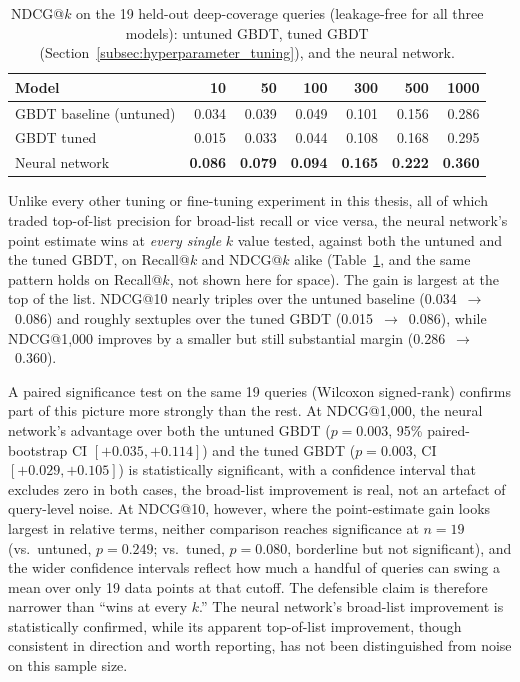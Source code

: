 \documentclass[a4paper,oneside,bibliography=totoc]{scrbook}
\begin{document}
\begin{table}[ht]
\centering
\caption{NDCG@$k$ on the 19 held-out deep-coverage queries (leakage-free for all three models): untuned GBDT, tuned GBDT (Section~\ref{subsec:hyperparameter_tuning}), and the neural network.}
\label{tab:neural_fusion_ranker}
\begin{tabular}{lrrrrrr}
\toprule
\textbf{Model} & \textbf{10} & \textbf{50} & \textbf{100} & \textbf{300} & \textbf{500} & \textbf{1000} \\
\midrule
GBDT baseline (untuned) & 0.034 & 0.039 & 0.049 & 0.101 & 0.156 & 0.286 \\
GBDT tuned               & 0.015 & 0.033 & 0.044 & 0.108 & 0.168 & 0.295 \\
Neural network            & \textbf{0.086} & \textbf{0.079} & \textbf{0.094} & \textbf{0.165} & \textbf{0.222} & \textbf{0.360} \\
\bottomrule
\end{tabular}
\end{table}

Unlike every other tuning or fine-tuning experiment in this thesis, all of which traded top-of-list precision for broad-list recall or vice versa, the neural network's point estimate wins at \emph{every single} $k$ value tested, against both the untuned and the tuned GBDT, on Recall@$k$ and NDCG@$k$ alike (Table~\ref{tab:neural_fusion_ranker}, and the same pattern holds on Recall@$k$, not shown here for space). The gain is largest at the top of the list. NDCG@10 nearly triples over the untuned baseline (0.034~$\to$~0.086) and roughly sextuples over the tuned GBDT (0.015~$\to$~0.086), while NDCG@1{,}000 improves by a smaller but still substantial margin (0.286~$\to$~0.360).

A paired significance test on the same 19 queries (Wilcoxon signed-rank) confirms part of this picture more strongly than the rest. At NDCG@1{,}000, the neural network's advantage over both the untuned GBDT ($p=0.003$, 95\% paired-bootstrap CI $[+0.035, +0.114]$) and the tuned GBDT ($p=0.003$, CI $[+0.029, +0.105]$) is statistically significant, with a confidence interval that excludes zero in both cases, the broad-list improvement is real, not an artefact of query-level noise. At NDCG@10, however, where the point-estimate gain looks largest in relative terms, neither comparison reaches significance at $n=19$ (vs.\ untuned, $p=0.249$; vs.\ tuned, $p=0.080$, borderline but not significant), and the wider confidence intervals reflect how much a handful of queries can swing a mean over only 19 data points at that cutoff. The defensible claim is therefore narrower than ``wins at every $k$.'' The neural network's broad-list improvement is statistically confirmed, while its apparent top-of-list improvement, though consistent in direction and worth reporting, has not been distinguished from noise on this sample size.
\end{document}
